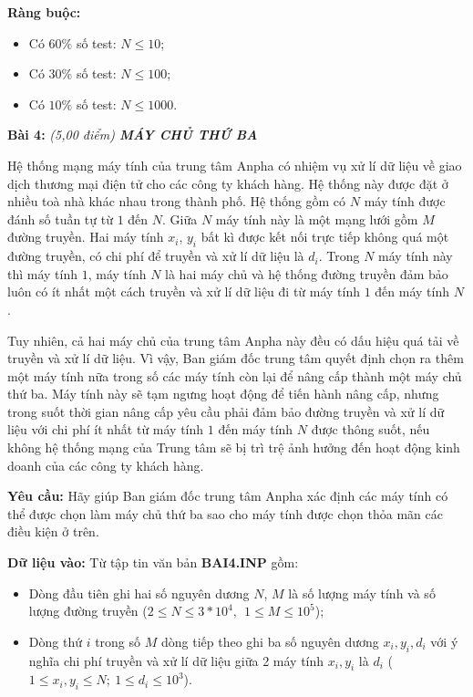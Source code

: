 \documentclass[
]{article}
\begin{document}
\textbf{Ràng buộc:}

\begin{itemize}
\item
  Có $60\%$ số test: $N \leq 10$;
\item
  Có $30\%$ số test: $N \leq 100$;
\item
  Có $10\%$ số test: $N \leq 1000$.
\end{itemize}

\textbf{Bài 4:} \it{(5,00 điểm)} \textbf{MÁY CHỦ THỨ BA}

Hệ thống mạng máy tính của trung tâm Anpha có nhiệm vụ xử lí dữ liệu về
giao dịch thương mại điện tử cho các công ty khách hàng. Hệ thống này
được đặt ở nhiều toà nhà khác nhau trong thành phố. Hệ thống gồm có
$N$ máy tính được đánh số tuần tự từ $1$ đến $N$. Giữa $N$ máy
tính này là một mạng lưới gồm $M$ đường truyền. Hai máy tính
$x_{i}$, $y_{i}$ bất kì được kết nối trực tiếp không quá một đường
truyền, có chi phí để truyền và xử lí dữ liệu là $d_{i}$. Trong $N$
máy tính này thì máy tính $1$, máy tính $N$ là hai máy chủ và hệ
thống đường truyền đảm bảo luôn có ít nhất một cách truyền và xử lí dữ
liệu đi từ máy tính $1$ đến máy tính $N$.

Tuy nhiên, cả hai máy chủ của trung tâm Anpha này đều có dấu hiệu quá
tải về truyền và xử lí dữ liệu. Vì vậy, Ban giám đốc trung tâm quyết
định chọn ra thêm một máy tính nữa trong số các máy tính còn lại để nâng
cấp thành một máy chủ thứ ba. Máy tính này sẽ tạm ngưng hoạt động để
tiến hành nâng cấp, nhưng trong suốt thời gian nâng cấp yêu cầu phải đảm
bảo đường truyền và xử lí dữ liệu với chi phí ít nhất từ máy tính $1$
đến máy tính $N$ được thông suốt, nếu không hệ thống mạng của Trung
tâm sẽ bị trì trệ ảnh hưởng đến hoạt động kinh doanh của các công ty
khách hàng.

\textbf{Yêu cầu:} Hãy giúp Ban giám đốc trung tâm Anpha xác định các máy
tính có thể được chọn làm máy chủ thứ ba sao cho máy tính được chọn thỏa
mãn các điều kiện ở trên.

\textbf{Dữ liệu vào:} Từ tập tin văn bản \textbf{BAI4.INP} gồm:

\begin{itemize}
\item
  Dòng đầu tiên ghi hai số nguyên dương $N$, $M$ là số lượng máy
  tính và số lượng đường truyền
  ($2 \leq N \leq 3*10^{4},\ \ 1 \leq M \leq 10^{5}$);
\item
  Dòng thứ $i$ trong số $M$ dòng tiếp theo ghi ba số nguyên dương
  $x_{i},y_{i},d_{i}$ với ý nghĩa chi phí truyền và xử lí dữ liệu giữa
  2 máy tính $x_{i},y_{i}$ là $d_{i}$
  ($1 \leq x_{i},y_{i} \leq N;\ 1 \leq d_{i} \leq 10^{3}$).
\end{itemize}
\end{document}
